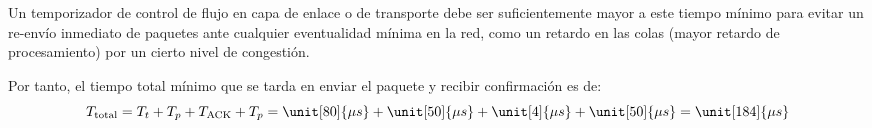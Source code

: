 \begin{ejercicio}
\begin{itemize}
        Un temporizador de control de flujo en capa de enlace o de transporte debe ser
        suficientemente mayor a este tiempo mínimo para evitar un re-envío inmediato de
        paquetes ante cualquier eventualidad mínima en la red, como un retardo en las colas
        (mayor retardo de procesamiento) por un cierto nivel de congestión.
    \end{itemize}

    Por tanto, el tiempo total mínimo que se tarda en enviar el paquete y recibir confirmación es de:
    \begin{equation*}
        T_{\text{total}} = T_t + T_p + T_{\text{ACK}} + T_p = \unit[80]{\mu s} + \unit[50]{\mu s} + \unit[4]{\mu s} + \unit[50]{\mu s} = \unit[184]{\mu s}
    \end{equation*}
\end{ejercicio}
